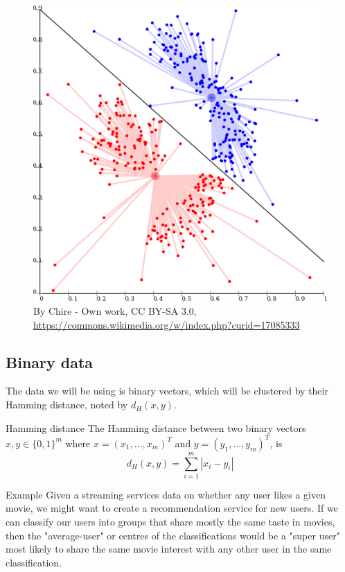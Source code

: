 \documentclass{beamer}
\begin{document}
\begin{frame}
  \begin{figure}
    \centering
    \includegraphics[height=0.75\textheight]{figures/1024px-KMeans-density-data.svg.png}
    \caption{By Chire - Own work, CC BY-SA 3.0, \url{https://commons.wikimedia.org/w/index.php?curid=17085333}}
  \end{figure}
\end{frame}

\subsection{Binary data}
\begin{frame}
  The data we will be using is \alert{binary vectors}, which will be
  clustered by their \alert{Hamming distance}, noted by $d_H(x,y)$.

  \begin{block}{Hamming distance}
    The Hamming distance between two binary vectors $x,y \in \{0,1\}^m$
    where $x=(x_1,...,x_m)^T$ and $y=(y_1,...,y_m)^T$, is
    \[
      d_H(x,y)= \sum_{i = 1}^{m} |x_i - y_i|
    \]
  \end{block}
\end{frame}

\begin{frame}
  \begin{block}{Example}
    Given a streaming services data on whether any user likes a given movie,
    we might want to create a recommendation service for new users.
    If we can classify our users into groups that share mostly the same taste in movies, then
    the "average-user" or centres of the classifications would be a "super user" most likely to share the same movie
    interest with any other user in the same classification.
  \end{block}
\end{frame}
\end{document}
